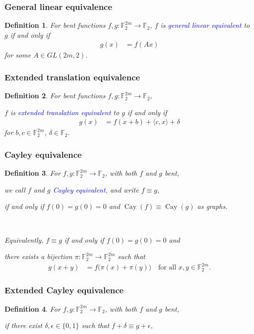 \documentclass[pdf,sprung,slideColor,nocolorBG]{beamer}
\newenvironment{colortheme}[1]{
\def\ProvidesPackageRCS $##1${\relax}
\renewcommand{\ProcessOptions}{\relax}
\makeatletter

\makeatother
}{}
\newcommand{\mb}[1]{\mathbb{#1}}
\newcommand{\Emph}[1]{\emph{\textcolor{blue}{#1}}}
\newcommand{\To}{\rightarrow}
\newcommand{\Cay}[1]{\operatorname{Cay}\left(#1\right)}
\newcommand{\F}{\mb{F}}
\newtheorem{Def}{Definition}
\begin{document}
\begin{colortheme}{jubata}

\begin{frame}
\frametitle{General linear equivalence}

\begin{Def}
For bent functions $f,g : \F_2^{2m} \To \F_2$,
$f$ is \Emph{general linear equivalent} to $g$ if and only if
\begin{align*}
g(x) &= f(A x)
\end{align*}
for some $A \in GL(2m,2)$.
\end{Def}
\end{frame}
\begin{frame}
\frametitle{Extended translation equivalence}

\begin{Def}
For bent functions $f,g : \F_2^{2m} \To \F_2$,

$f$ is \Emph{extended translation equivalent} to $g$ if and only if
\begin{align*}
g(x) &= f(x + b) + \langle c, x \rangle + \delta
\end{align*}
for $b, c \in \F_2^{2m}$, $\delta \in \F_2$.
\end{Def}
\end{frame}

\begin{frame}
\frametitle{Cayley equivalence}
\begin{Def}
%
For $f, g : \F_2^{2m} \To \F_2$, with both $f$ and $g$ bent,

we call $f$ and $g$ \Emph{Cayley equivalent},
and write $f \equiv g$,

if and only if $f(0)=g(0)=0$ and $\Cay{f} \equiv \Cay{g}$ as graphs.

~

Equivalently, $f \equiv g$ if and only if $f(0)=g(0)=0$ and

there exists a bijection $\pi : \F_2^{2m} \To \F_2^{2m}$ such that
\begin{align*}
g(x+y) &= f \big(\pi(x)+\pi(y)\big) \quad \text{for all~} x,y \in \F_2^{2m}.
\end{align*}
\end{Def}
\end{frame}
\begin{frame}
\frametitle{Extended Cayley equivalence}
\begin{Def}
For $f, g : \F_2^{2m} \To \F_2$, with both $f$ and $g$ bent,

if there exist $\delta, \epsilon \in \{0,1\}$ such that $f + \delta \equiv g + \epsilon$,


\end{Def}
\end{frame}
\end{colortheme}
\end{document}
